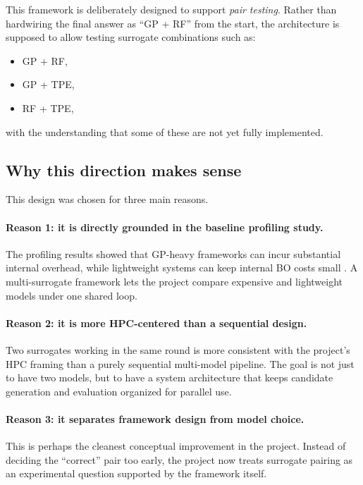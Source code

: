 \documentclass[11pt]{article}
\begin{document}
This framework is deliberately designed to support \emph{pair testing}. Rather than hardwiring the final answer as ``GP + RF'' from the start, the architecture is supposed to allow testing surrogate combinations such as:
\begin{itemize}[leftmargin=1.5em]
    \item GP + RF,
    \item GP + TPE,
    \item RF + TPE,
\end{itemize}
with the understanding that some of these are not yet fully implemented.

\subsection{Why this direction makes sense}

This design was chosen for three main reasons.

\paragraph{Reason 1: it is directly grounded in the baseline profiling study.}
The profiling results showed that GP-heavy frameworks can incur substantial internal overhead, while lightweight systems can keep internal BO costs small \cite{oumer2026baseline}. A multi-surrogate framework lets the project compare expensive and lightweight models under one shared loop.

\paragraph{Reason 2: it is more HPC-centered than a sequential design.}
Two surrogates working in the same round is more consistent with the project’s HPC framing than a purely sequential multi-model pipeline. The goal is not just to have two models, but to have a system architecture that keeps candidate generation and evaluation organized for parallel use.

\paragraph{Reason 3: it separates framework design from model choice.}
This is perhaps the cleanest conceptual improvement in the project. Instead of deciding the ``correct'' pair too early, the project now treats surrogate pairing as an experimental question supported by the framework itself.
\end{document}
